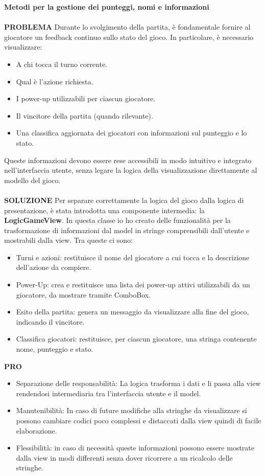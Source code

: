 \documentclass[a4paper,12pt]{report}
\begin{document}
\textbf{Metodi per la gestione dei punteggi, nomi e informazioni}
\\
\\
\textbf{PROBLEMA}
Durante lo svolgimento della partita, è fondamentale fornire al giocatore un feedback continuo sullo stato del gioco. In particolare, è necessario visualizzare:
\begin{itemize}
	\item A chi tocca il turno corrente.
	\item Qual è l’azione richiesta.
	\item I power-up utilizzabili per ciascun giocatore.
	\item Il vincitore della partita (quando rilevante).
	\item Una classifica aggiornata dei giocatori con informazioni sul punteggio e lo stato.
\end{itemize}
Queste informazioni devono essere rese accessibili in modo intuitivo e integrato nell’interfaccia utente, 
senza legare la logica della visualizzazione direttamente al modello del gioco.
\\
\\
\textbf{SOLUZIONE}
Per separare correttamente la logica del gioco dalla logica di presentazione, è stata introdotta una componente intermedia: la \textbf{LogicGameView}.
In questa classe io ho creato delle funzionalità per la trasformazione di informazioni dal model in stringe comprensibili dall'utente e mostrabili dalla view.
Tra queste ci sono:
\begin{itemize}
	\item Turni e azioni: restituisce il nome del giocatore a cui tocca e la descrizione dell’azione da compiere.
	\item Power-Up: crea e restituisce una lista dei power-up attivi utilizzabili da un giocatore, da mostrare tramite ComboBox.
	\item Esito della partita: genera un messaggio da visualizzare alla fine del gioco, indicando il vincitore.
	\item Classifica giocatori: restituisce, per ciascun giocatore, una stringa contenente nome, punteggio e stato.
\end{itemize}
\textbf{PRO}
\begin{itemize}
	\item Separazione delle responsabilità: La logica trasforma i dati e li passa alla view rendendosi intermediaria tra l'interfaccia utente e il model.
	\item Manutenibilità: In caso di future modifiche alla stringhe da visualizzare si possono cambiare codici poco complessi e distaccati dalla view quindi di facile elaborazione.
	\item Flessibilità: in caso di necessità queste informazioni possono essere mostrate dalla view in modi differenti senza dover ricorrere a un ricalcolo delle stringhe.
\end{itemize}
\end{document}

